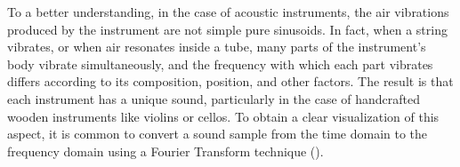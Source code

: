 \documentclass[sigconf,natbib=false]{acmart}
\begin{document}




To a better understanding, in the case of acoustic instruments, the air vibrations produced by the instrument are not simple pure sinusoids. In fact, when a string vibrates, or when air resonates inside a tube, many parts of the instrument's body vibrate simultaneously, and the frequency with which each part vibrates differs according to its composition, position, and other factors. The result is that each instrument has a unique sound, particularly in the case of handcrafted wooden instruments like violins or cellos. To obtain a clear visualization of this aspect, it is common to convert a sound sample from the time domain to the frequency domain using a Fourier Transform technique (\textcite{benson2008music}).

\end{document}
